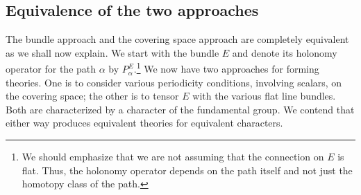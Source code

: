 \documentclass[11pt]{article}
\theoremstyle{remark}
\begin{document}
\subsection{Equivalence of the two approaches} \label{iss:bunequ}

The bundle approach and the covering space approach are completely
equivalent as we shall now explain. We start with the bundle $E$ 
and denote its holonomy operator for the path $\alpha$ by
$P^E_{\alpha}$.\footnote{We should emphasize that we
are not assuming that the connection on $E$ is flat. Thus, the holonomy
operator depends on the path itself and not just the homotopy
class of the path.} 
We
now have two approaches for forming theories. One is to consider
various periodicity conditions, involving scalars, on the covering
space; the other is to tensor $E$ with the various flat line
bundles. Both are characterized by a character of the fundamental
group. We contend that either way produces equivalent theories for
equivalent characters.
\end{document}
